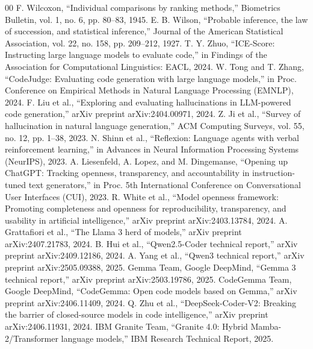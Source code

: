 \documentclass[conference]{IEEEtran}
\begin{document}
\begin{thebibliography}{00}
 F. Wilcoxon, ``Individual comparisons by ranking methods,'' Biometrics Bulletin, vol. 1, no. 6, pp. 80--83, 1945.
 E. B. Wilson, ``Probable inference, the law of succession, and statistical inference,'' Journal of the American Statistical Association, vol. 22, no. 158, pp. 209--212, 1927.
 T. Y. Zhuo, ``ICE-Score: Instructing large language models to evaluate code,'' in Findings of the Association for Computational Linguistics: EACL, 2024.
 W. Tong and T. Zhang, ``CodeJudge: Evaluating code generation with large language models,'' in Proc. Conference on Empirical Methods in Natural Language Processing (EMNLP), 2024.
 F. Liu et al., ``Exploring and evaluating hallucinations in LLM-powered code generation,'' arXiv preprint arXiv:2404.00971, 2024.
 Z. Ji et al., ``Survey of hallucination in natural language generation,'' ACM Computing Surveys, vol. 55, no. 12, pp. 1--38, 2023.
 N. Shinn et al., ``Reflexion: Language agents with verbal reinforcement learning,'' in Advances in Neural Information Processing Systems (NeurIPS), 2023.
 A. Liesenfeld, A. Lopez, and M. Dingemanse, ``Opening up ChatGPT: Tracking openness, transparency, and accountability in instruction-tuned text generators,'' in Proc. 5th International Conference on Conversational User Interfaces (CUI), 2023.
 R. White et al., ``Model openness framework: Promoting completeness and openness for reproducibility, transparency, and usability in artificial intelligence,'' arXiv preprint arXiv:2403.13784, 2024.
 A. Grattafiori et al., ``The Llama 3 herd of models,'' arXiv preprint arXiv:2407.21783, 2024.
 B. Hui et al., ``Qwen2.5-Coder technical report,'' arXiv preprint arXiv:2409.12186, 2024.
 A. Yang et al., ``Qwen3 technical report,'' arXiv preprint arXiv:2505.09388, 2025.
 Gemma Team, Google DeepMind, ``Gemma 3 technical report,'' arXiv preprint arXiv:2503.19786, 2025.
 CodeGemma Team, Google DeepMind, ``CodeGemma: Open code models based on Gemma,'' arXiv preprint arXiv:2406.11409, 2024.
 Q. Zhu et al., ``DeepSeek-Coder-V2: Breaking the barrier of closed-source models in code intelligence,'' arXiv preprint arXiv:2406.11931, 2024.
 IBM Granite Team, ``Granite 4.0: Hybrid Mamba-2/Transformer language models,'' IBM Research Technical Report, 2025.

\end{thebibliography}
\end{document}
